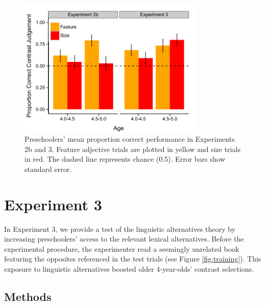 \documentclass[10pt,letterpaper]{article}
\begin{document}
\begin{figure}[t] 
  \begin{center} 
    \includegraphics[width=3.5in]{figures/results_expt2b&3_n75.pdf} 
    \caption{\label{fig:kids2} Preschoolers' mean proportion correct performance in Experiments 2b and 3.  Feature adjective trials are plotted in yellow and size trials in red.
The dashed line represents chance (0.5). Error bars show standard error.}
  \end{center} 
\end{figure}

\section{Experiment 3} 




In Experiment 3, we provide a test of the linguistic alternatives theory by increasing preschoolers' access to the relevant lexical alternatives.  Before the experimental procedure, the experimenter read a seemingly unrelated book featuring the opposites referenced in the test trials (see Figure \ref{fig:training}).  This exposure to linguistic alternatives boosted older 4-year-olds' contrast selections. 

\subsection{Methods}
\end{document}

